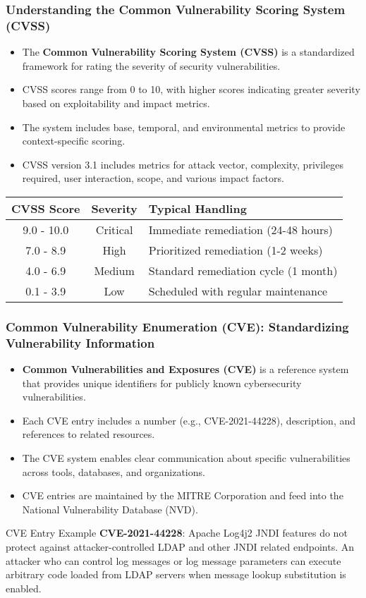 \documentclass{beamer}
\begin{document}
\begin{frame}
\frametitle{Understanding the Common Vulnerability Scoring System (CVSS)}
\begin{itemize}
\item The \textbf{Common Vulnerability Scoring System (CVSS)} is a standardized framework for rating the severity of security vulnerabilities.
\item CVSS scores range from 0 to 10, with higher scores indicating greater severity based on exploitability and impact metrics.
\item The system includes base, temporal, and environmental metrics to provide context-specific scoring.
\item CVSS version 3.1 includes metrics for attack vector, complexity, privileges required, user interaction, scope, and various impact factors.
\end{itemize}

\begin{table}
\scriptsize
\centering
\begin{tabular}{ccp{7cm}}
\toprule
\textbf{CVSS Score} & \textbf{Severity} & \textbf{Typical Handling} \\
\midrule
9.0 - 10.0 & Critical & Immediate remediation (24-48 hours) \\
7.0 - 8.9 & High & Prioritized remediation (1-2 weeks) \\
4.0 - 6.9 & Medium & Standard remediation cycle (1 month) \\
0.1 - 3.9 & Low & Scheduled with regular maintenance \\
\bottomrule
\end{tabular}
\end{table}
\end{frame}

\begin{frame}
\frametitle{Common Vulnerability Enumeration (CVE): Standardizing Vulnerability Information}
\begin{itemize}
\item \textbf{Common Vulnerabilities and Exposures (CVE)} is a reference system that provides unique identifiers for publicly known cybersecurity vulnerabilities.
\item Each CVE entry includes a number (e.g., CVE-2021-44228), description, and references to related resources.
\item The CVE system enables clear communication about specific vulnerabilities across tools, databases, and organizations.
\item CVE entries are maintained by the MITRE Corporation and feed into the National Vulnerability Database (NVD).
\end{itemize}

\begin{exampleblock}{CVE Entry Example}
\scriptsize
\textbf{CVE-2021-44228}: Apache Log4j2 JNDI features do not protect against attacker-controlled LDAP and other JNDI related endpoints. An attacker who can control log messages or log message parameters can execute arbitrary code loaded from LDAP servers when message lookup substitution is enabled.
\end{exampleblock}
\end{frame}
\end{document}

